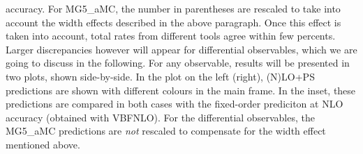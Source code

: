 accuracy. For {\sc MG5\_aMC}, the number in parentheses are rescaled to take into account the width effects described in the above paragraph. Once this effect is taken into
account, total rates from different tools agree within few percents. Larger discrepancies however will appear for differential observables, which we are going to discuss in 
the following. For any observable, results will be presented in two plots, shown side-by-side. In the plot on the left (right), (N)LO+PS predictions are shown 
with different colours in the main frame. In the inset, these predictions are compared in both cases with the fixed-order prediciton at NLO accuracy (obtained with 
{\sc VBFNLO}). For the differential observables, the {\sc MG5\_aMC} predictions are \emph{not} rescaled to compensate for the width effect mentioned above.\\

